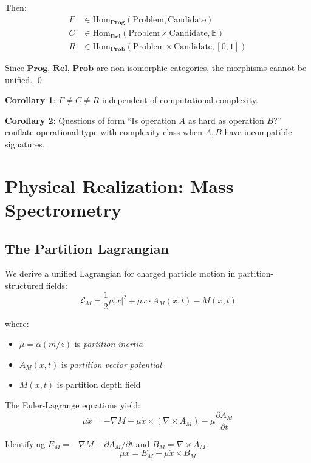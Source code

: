 \documentclass[twocolumn,aps,prl,superscriptaddress,floatfix]{revtex4-2}
\begin{document}
Then:
\begin{align}
F &\in \text{Hom}_{\mathbf{Prog}}(\text{Problem}, \text{Candidate}) \\
C &\in \text{Hom}_{\mathbf{Rel}}(\text{Problem} \times \text{Candidate}, \mathbb{B}) \\
R &\in \text{Hom}_{\mathbf{Prob}}(\text{Problem} \times \text{Candidate}, [0,1])
\end{align}

Since $\mathbf{Prog}$, $\mathbf{Rel}$, $\mathbf{Prob}$ are non-isomorphic categories, the morphisms cannot be unified. \qed

\textbf{Corollary 1}: $F \neq C \neq R$ independent of computational complexity.

\textbf{Corollary 2}: Questions of form ``Is operation $A$ as hard as operation $B$?'' conflate operational type with complexity class when $A, B$ have incompatible signatures.

\section{Physical Realization: Mass Spectrometry}

\subsection{The Partition Lagrangian}

We derive a unified Lagrangian for charged particle motion in partition-structured fields:
\begin{equation}
\mathcal{L}_M = \frac{1}{2}\mu|\dot{x}|^2 + \mu \dot{x} \cdot A_M(x,t) - M(x,t)
\label{eq:partition_lagrangian}
\end{equation}

where:
\begin{itemize}
\item $\mu = \alpha(m/z)$ is \emph{partition inertia}
\item $A_M(x,t)$ is \emph{partition vector potential}
\item $M(x,t)$ is partition depth field
\end{itemize}

The Euler-Lagrange equations yield:
\begin{equation}
\mu \ddot{x} = -\nabla M + \mu \dot{x} \times (\nabla \times A_M) - \mu \frac{\partial A_M}{\partial t}
\label{eq:partition_eom}
\end{equation}

Identifying $E_M = -\nabla M - \partial A_M/\partial t$ and $B_M = \nabla \times A_M$:
\begin{equation}
\mu \ddot{x} = E_M + \mu \dot{x} \times B_M
\end{equation}
\end{document}
